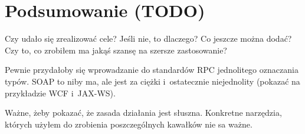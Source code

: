 \chapter{Podsumowanie (TODO)}
Czy udało się zrealizować cele? Jeśli nie, to dlaczego? Co jeszcze można dodać? Czy to, co zrobiłem ma jakąś szansę na szersze zastosowanie?

Pewnie przydałoby się wprowadzanie do standardów RPC jednolitego oznaczania typów. SOAP to niby ma, ale jest za ciężki i~ostatecznie niejednolity (pokazać na przykładzie WCF i~JAX-WS).

Ważne, żeby pokazać, że zasada działania jest słuszna. Konkretne narzędzia, których użyłem do zrobienia poszczególnych kawałków nie sa ważne.

%

